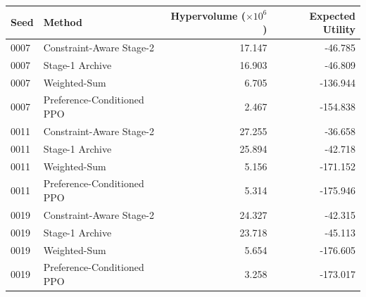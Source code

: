 \begin{tabular}{@{}llrr@{}}
\toprule
Seed & Method & Hypervolume ($\times 10^6$) & Expected Utility \\
\midrule
0007 & Constraint-Aware Stage-2 & 17.147 & -46.785 \\
0007 & Stage-1 Archive & 16.903 & -46.809 \\
0007 & Weighted-Sum & 6.705 & -136.944 \\
0007 & Preference-Conditioned PPO & 2.467 & -154.838 \\
0011 & Constraint-Aware Stage-2 & 27.255 & -36.658 \\
0011 & Stage-1 Archive & 25.894 & -42.718 \\
0011 & Weighted-Sum & 5.156 & -171.152 \\
0011 & Preference-Conditioned PPO & 5.314 & -175.946 \\
0019 & Constraint-Aware Stage-2 & 24.327 & -42.315 \\
0019 & Stage-1 Archive & 23.718 & -45.113 \\
0019 & Weighted-Sum & 5.654 & -176.605 \\
0019 & Preference-Conditioned PPO & 3.258 & -173.017 \\
\bottomrule
\end{tabular}
